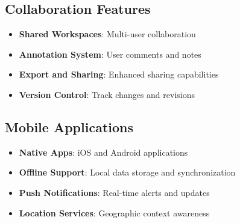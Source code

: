 \subsection{Collaboration Features}
\begin{itemize}
\item \textbf{Shared Workspaces}: Multi-user collaboration
\item \textbf{Annotation System}: User comments and notes
\item \textbf{Export and Sharing}: Enhanced sharing capabilities
\item \textbf{Version Control}: Track changes and revisions
\end{itemize}

\subsection{Mobile Applications}
\begin{itemize}
\item \textbf{Native Apps}: iOS and Android applications
\item \textbf{Offline Support}: Local data storage and synchronization
\item \textbf{Push Notifications}: Real-time alerts and updates
\item \textbf{Location Services}: Geographic context awareness
\end{itemize}

